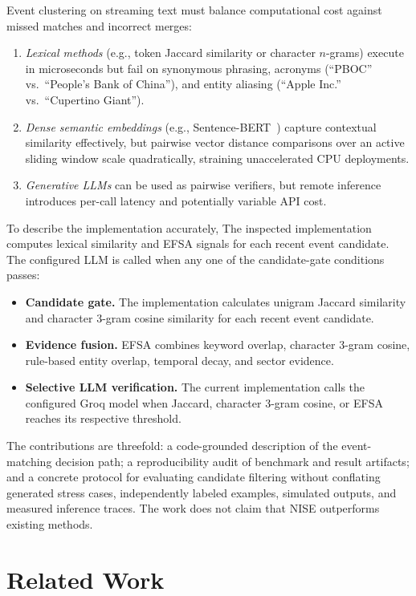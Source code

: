 \documentclass[conference]{IEEEtran}
\begin{document}
Event clustering on streaming text must balance computational cost against missed matches and incorrect merges:
\begin{enumerate}
    \item \textit{Lexical methods} (e.g., token Jaccard similarity or character $n$-grams) execute in microseconds but fail on synonymous phrasing, acronyms (``PBOC'' vs.\ ``People's Bank of China''), and entity aliasing (``Apple Inc.'' vs.\ ``Cupertino Giant'').
    \item \textit{Dense semantic embeddings} (e.g., Sentence-BERT~\cite{reimers2019sentence}) capture contextual similarity effectively, but pairwise vector distance comparisons over an active sliding window scale quadratically, straining unaccelerated CPU deployments.
    \item \textit{Generative LLMs} can be used as pairwise verifiers, but remote inference introduces per-call latency and potentially variable API cost.
\end{enumerate}

To describe the implementation accurately, The inspected implementation computes lexical similarity and EFSA signals for each recent event candidate. The configured LLM is called when any one of the candidate-gate conditions passes:
\begin{itemize}
    \item \textbf{Candidate gate.} The implementation calculates unigram Jaccard similarity and character 3-gram cosine similarity for each recent event candidate.
    \item \textbf{Evidence fusion.} EFSA combines keyword overlap, character 3-gram cosine, rule-based entity overlap, temporal decay, and sector evidence.
    \item \textbf{Selective LLM verification.} The current implementation calls the configured Groq model when Jaccard, character 3-gram cosine, or EFSA reaches its respective threshold.
\end{itemize}

The contributions are threefold: a code-grounded description of the event-matching decision path; a reproducibility audit of benchmark and result artifacts; and a concrete protocol for evaluating candidate filtering without conflating generated stress cases, independently labeled examples, simulated outputs, and measured inference traces. The work does not claim that NISE outperforms existing methods.

\section{Related Work}
\end{document}
